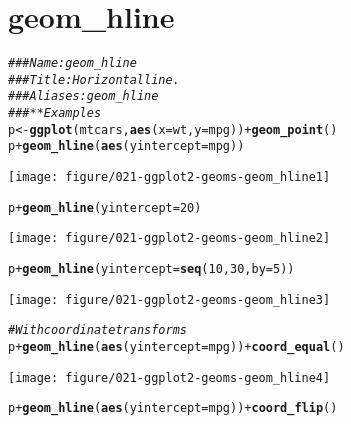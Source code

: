 \documentclass[a4paper,titlepage]{tufte-handout}\usepackage[]{graphicx}\usepackage[]{color}
\makeatletter
\def\maxwidth{ %
  \ifdim\Gin@nat@width>\linewidth
    \linewidth
  \else
    \Gin@nat@width
  \fi
}
\newcommand{\hlnum}[1]{\textcolor[rgb]{0.686,0.059,0.569}{#1}}%
\newcommand{\hlcom}[1]{\textcolor[rgb]{0.678,0.584,0.686}{\textit{#1}}}%
\newcommand{\hlopt}[1]{\textcolor[rgb]{0,0,0}{#1}}%
\newcommand{\hlstd}[1]{\textcolor[rgb]{0.345,0.345,0.345}{#1}}%
\newcommand{\hlkwb}[1]{\textcolor[rgb]{0.69,0.353,0.396}{#1}}%
\newcommand{\hlkwc}[1]{\textcolor[rgb]{0.333,0.667,0.333}{#1}}%
\newcommand{\hlkwd}[1]{\textcolor[rgb]{0.737,0.353,0.396}{\textbf{#1}}}%
\newenvironment{kframe}{%
 \def\at@end@of@kframe{}%
 \ifinner\ifhmode%
  \def\at@end@of@kframe{\end{minipage}}%
  \begin{minipage}{\columnwidth}%
 \fi\fi%
 \def\FrameCommand##1{\hskip\@totalleftmargin \hskip-\fboxsep
 \colorbox{shadecolor}{##1}\hskip-\fboxsep
     \hskip-\linewidth \hskip-\@totalleftmargin \hskip\columnwidth}%
 \MakeFramed {\advance\hsize-\width
   \@totalleftmargin\z@ \linewidth\hsize
   \@setminipage}}%
 {\par\unskip\endMakeFramed%
 \at@end@of@kframe}
\newenvironment{knitrout}{}{} %
\makeatother
\begin{document}
\section{geom\_hline}

\begin{knitrout}
\color{fgcolor}\begin{kframe}
\begin{alltt}
\hlcom{### Name: geom_hline}
\hlcom{### Title: Horizontal line.}
\hlcom{### Aliases: geom_hline}
\hlcom{### ** Examples}
\hlstd{p} \hlkwb{<-} \hlkwd{ggplot}\hlstd{(mtcars,} \hlkwd{aes}\hlstd{(}\hlkwc{x} \hlstd{= wt,} \hlkwc{y}\hlstd{=mpg))} \hlopt{+} \hlkwd{geom_point}\hlstd{()}
\hlstd{p} \hlopt{+} \hlkwd{geom_hline}\hlstd{(}\hlkwd{aes}\hlstd{(}\hlkwc{yintercept}\hlstd{=mpg))}
\end{alltt}
\end{kframe}
\texttt{[image: figure/021-ggplot2-geoms-geom\_hline1]} 
\begin{kframe}\begin{alltt}
\hlstd{p} \hlopt{+} \hlkwd{geom_hline}\hlstd{(}\hlkwc{yintercept}\hlstd{=}\hlnum{20}\hlstd{)}
\end{alltt}
\end{kframe}
\texttt{[image: figure/021-ggplot2-geoms-geom\_hline2]} 
\begin{kframe}\begin{alltt}
\hlstd{p} \hlopt{+} \hlkwd{geom_hline}\hlstd{(}\hlkwc{yintercept}\hlstd{=}\hlkwd{seq}\hlstd{(}\hlnum{10}\hlstd{,} \hlnum{30}\hlstd{,} \hlkwc{by}\hlstd{=}\hlnum{5}\hlstd{))}
\end{alltt}
\end{kframe}
\texttt{[image: figure/021-ggplot2-geoms-geom\_hline3]} 
\begin{kframe}\begin{alltt}
\hlcom{# With coordinate transforms}
\hlstd{p} \hlopt{+} \hlkwd{geom_hline}\hlstd{(}\hlkwd{aes}\hlstd{(}\hlkwc{yintercept}\hlstd{=mpg))} \hlopt{+} \hlkwd{coord_equal}\hlstd{()}
\end{alltt}
\end{kframe}
\texttt{[image: figure/021-ggplot2-geoms-geom\_hline4]} 
\begin{kframe}\begin{alltt}
\hlstd{p} \hlopt{+} \hlkwd{geom_hline}\hlstd{(}\hlkwd{aes}\hlstd{(}\hlkwc{yintercept}\hlstd{=mpg))} \hlopt{+} \hlkwd{coord_flip}\hlstd{()}
\end{alltt}

\end{kframe}
\end{knitrout}
\end{document}
